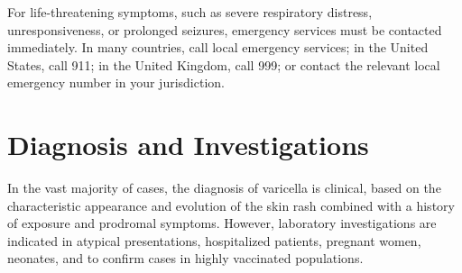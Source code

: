 For life-threatening symptoms, such as severe respiratory distress, unresponsiveness, or prolonged seizures, emergency services must be contacted immediately. In many countries, call local emergency services; in the United States, call 911; in the United Kingdom, call 999; or contact the relevant local emergency number in your jurisdiction.

\section*{Diagnosis and Investigations}
In the vast majority of cases, the diagnosis of varicella is clinical, based on the characteristic appearance and evolution of the skin rash combined with a history of exposure and prodromal symptoms. However, laboratory investigations are indicated in atypical presentations, hospitalized patients, pregnant women, neonates, and to confirm cases in highly vaccinated populations.

